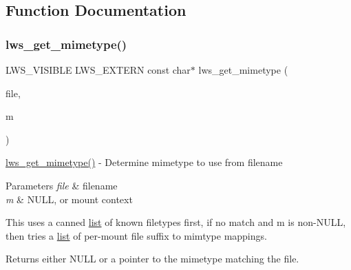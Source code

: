 \subsection{Function Documentation}
\mbox{\label{group__httpft_gab4da87a4800413f15e7aba649fb1d77c}} 
\subsubsection{\texorpdfstring{lws\+\_\+get\+\_\+mimetype()}{lws\_get\_mimetype()}}
{\footnotesize\ttfamily L\+W\+S\+\_\+\+V\+I\+S\+I\+B\+LE L\+W\+S\+\_\+\+E\+X\+T\+E\+RN const char$\ast$ lws\+\_\+get\+\_\+mimetype (\begin{DoxyParamCaption}\item[{const char $\ast$}]{file,  }\item[{const struct \hyperlink{structlws__http__mount}{lws\+\_\+http\+\_\+mount} $\ast$}]{m }\end{DoxyParamCaption})}

\hyperlink{group__httpft_gab4da87a4800413f15e7aba649fb1d77c}{lws\+\_\+get\+\_\+mimetype()} -\/ Determine mimetype to use from filename


\begin{DoxyParams}{Parameters}
{\em file} & filename \\
\hline
{\em m} & N\+U\+LL, or mount context\\
\hline
\end{DoxyParams}
This uses a canned \hyperlink{protocollist-p}{list} of known filetypes first, if no match and m is non-\/\+N\+U\+LL, then tries a \hyperlink{protocollist-p}{list} of per-\/mount file suffix to mimtype mappings.

Returns either N\+U\+LL or a pointer to the mimetype matching the file. \mbox{\label{group__httpft_gab393a06d3d2722af4c3f8b06842c80d7}} 
